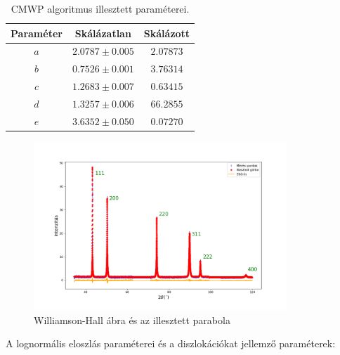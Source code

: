 \documentclass[12pt]{article}
\theoremstyle{plain}
\begin{document}
\vspace{.2cm}

\begin{table}[H]
	\begin{center}
		\begin{tabular}{|c|c|c|} \hline
			Paraméter & Skálázatlan        & Skálázott \\ \hline
			$a$       & $2.0787 \pm 0.005$ & $2.07873$ \\ \hline
			$b$       & $0.7526 \pm 0.001$ & $3.76314$ \\ \hline
			$c$       & $1.2683 \pm 0.007$ & $0.63415$ \\ \hline
			$d$       & $1.3257 \pm 0.006$ & $66.2855$ \\ \hline
			$e$       & $3.6352 \pm 0.050$ & $0.07270$ \\ \hline
		\end{tabular}
		\caption{CMWP algoritmus illesztett paraméterei.}
	\end{center}
	\label{table:cmwp}
\end{table}

\begin{figure}[H]
	\begin{center}
		\includegraphics[width=0.85\textwidth]{./xray-lab/cmwp.png}
		\caption{Williamson-Hall ábra és az illesztett parabola}
	\end{center}
	\label{fig:cmwp}
\end{figure}

\vspace{.2cm}

\par A lognormális eloszlás paraméterei és a diszlokációkat jellemző paraméterek:

\vspace{.2cm}
\end{document}
